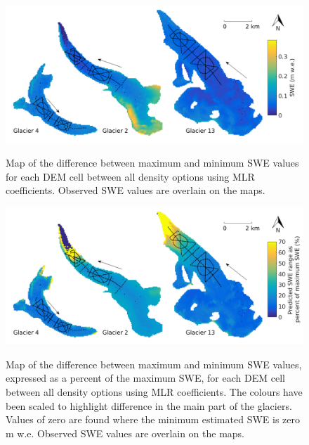 \documentclass{sfuthesis}
\newcommand{\swedots}{Observed SWE values are overlain on the maps. }
\begin{document}
\begin{figure}[H]
	\centering
	\includegraphics[width =\textwidth]{MLR_SWEdifferenceMap.png}\\
	\caption{Map of the difference between maximum and minimum SWE values for each DEM cell between all density options using MLR coefficients. \swedots}
	\label{fig:MLR_SWEdiffMap}
\end{figure}

 \begin{figure}[H]
	\centering
	\includegraphics[width =\textwidth]{MLR_SWEdifferenceMap_percent.png}\\
	\caption{Map of the difference between maximum and minimum SWE values, expressed as a percent of the maximum SWE, for each DEM cell between all density options using MLR coefficients. The colours have been scaled to highlight difference in the main part of the glaciers. Values of zero are found where the minimum estimated SWE is zero m w.e. \swedots}
	\label{fig:MLR_SWEdiffMapPercent}
\end{figure}
 
\end{document}
